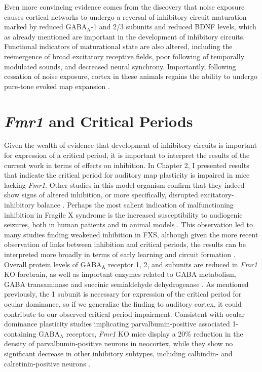 Even more convincing evidence comes from the discovery that noise exposure causes cortical networks to undergo a reversal of inhibitory circuit maturation marked by reduced GABA$_\mathrm{A}$-\textalpha{}1 and \textbeta{}2/3 subunits and reduced BDNF levels, which as already mentioned are important in the development of inhibitory circuits. Functional indicators of maturational state are also altered, including the re\"emergence of broad excitatory receptive fields, poor following of temporally modulated sounds, and decreased neural synchrony. Importantly, following cessation of noise exposure, cortex in these animals regains the ability to undergo pure-tone evoked map expansion \cite{Zhou2011}.

\section{\textit{Fmr1} and Critical Periods}
Given the wealth of evidence that development of inhibitory circuits is important for expression of a critical period, it is important to interpret the results of the current work in terms of effects on inhibition. In Chapter 2, I presented results that indicate the critical period for auditory map plasticity is impaired in mice lacking \textit{Fmr1}. Other studies in this model organism confirm that they indeed show signs of altered inhibition, or more specifically, disrupted excitatory-inhibitory balance \cite{Gibson2008}. Perhaps the most salient indication of malfunctioning inhibition in Fragile X syndrome is the increased susceptibility to audiogenic seizures, both in human patients and in animal models \cite{Hagerman, Chen2001}. This observation led to many studies finding weakened inhibition in FXS, although given the more recent observation of links between inhibition and critical periods, the results can be interpreted more broadly in terms of early learning and circuit formation \cite{ElIdrissi2005}. Overall protein levels of GABA$_\mathrm{A}$ receptor \textalpha{}1, \textbeta{}2, and \textdelta{} subunits are reduced in \textit{Fmr1} KO forebrain, as well as important enzymes related to GABA metabolism, GABA transaminase and succinic semialdehyde dehydrogenase \cite{Adusei2010}. As mentioned previously, the \textalpha{}1 subunit is necessary for expression of the critical period for ocular dominance, so if we generalize the finding to auditory cortex, it could contribute to our observed critical period impairment. Consistent with ocular dominance plasticity studies implicating parvalbumin-positive associated \textalpha{}1-containing GABA$_\mathrm{A}$ receptors, \textit{Fmr1} KO mice display a 20\% reduction in the density of parvalbumin-positive neurons in neocortex, while they show no significant decrease in other inhibitory subtypes, including calbindin- and calretinin-positive neurons \cite{Selby2007}.

